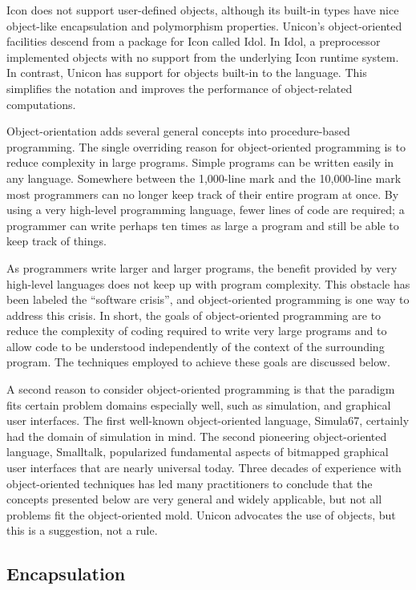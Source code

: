 Icon does not support user-defined objects, although its built-in types
have nice object-like encapsulation and polymorphism properties.
Unicon's object-oriented facilities descend from a
package for Icon called Idol. In Idol, a preprocessor
implemented objects with no support from the underlying Icon runtime
system. In contrast, Unicon has support for objects built-in to the
language. This simplifies the notation and improves the performance of
object-related computations.

Object-orientation adds several general concepts into procedure-based
programming. The single overriding reason for object-oriented programming is to reduce complexity in
large programs. Simple programs can be written easily in any language.
Somewhere between the 1,000-line mark and the 10,000-line mark most
programmers can no longer keep track of their entire program at once.
By using a very high-level programming language, fewer lines of code
are required; a programmer can write perhaps ten times as large a
program and still be able to keep track of things.

As programmers write larger and larger programs, the benefit provided by
very high-level languages does not keep
up with program complexity. This obstacle has been labeled the
``software crisis'', and object-oriented
programming is one way to address this crisis. In short, the goals of
object-oriented programming are to reduce the complexity of coding
required to write very large programs and to allow code to be
understood independently of the context of the surrounding program. The
techniques employed to achieve these goals are discussed below.

A second reason to consider object-oriented programming is that the
paradigm fits certain problem domains especially well, such as
simulation, and graphical user interfaces. The first well-known
object-oriented language, Simula67, certainly had the
domain of simulation in mind. The second pioneering object-oriented
language, Smalltalk, popularized fundamental aspects of bitmapped
graphical user interfaces that are nearly universal today. Three
decades of experience with object-oriented techniques has led many
practitioners to conclude that the concepts presented below are very
general and widely applicable, but not all problems fit the
object-oriented mold. Unicon advocates the use of objects, but this is
a suggestion, not a rule.

\subsection*{Encapsulation}

